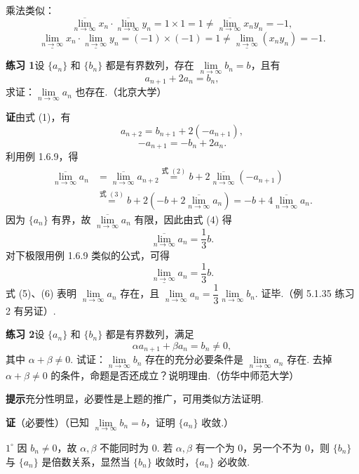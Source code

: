 \documentclass[UTF8,12pt,a4paper,fontset=fandol]{ctexart}
\begin{document}
乘法类似：
\[
  \overline{\lim_{n\to\infty}}x_n\cdot\overline{\lim_{n\to\infty}}y_n=1\times1=1
  \ne \overline{\lim_{n\to\infty}}x_ny_n=-1,
\]
\[
  \underline{\lim_{n\to\infty}}x_n\cdot\underline{\lim_{n\to\infty}}y_n=(-1)\times(-1)=1
  \ne \underline{\lim_{n\to\infty}}(x_ny_n)=-1.
\]

\noindent\textbf{练习 1}\quad 设 $\{a_n\}$ 和 $\{b_n\}$ 都是有界数列，存在 $\lim\limits_{n\to\infty}b_n=b$，且有
\[
  a_{n+1}+2a_n=b_n,
\tag{1}
\]
求证：$\lim\limits_{n\to\infty}a_n$ 也存在.（北京大学）

\noindent\textbf{证}\quad 由式 (1)，有
\[
  a_{n+2}=b_{n+1}+2(-a_{n+1}),
\tag{2}
\]
\[
  -a_{n+1}=-b_n+2a_n.
\tag{3}
\]
利用例 1.6.9，得
\[
\begin{aligned}
  \overline{\lim_{n\to\infty}}a_n
  &=\overline{\lim_{n\to\infty}}a_{n+2}
   \overset{\text{式 }(2)}{=} b+2\overline{\lim_{n\to\infty}}(-a_{n+1})\\
  &\overset{\text{式 }(3)}{=} b+2\left(-b+2\overline{\lim_{n\to\infty}}a_n\right)
   =-b+4\overline{\lim_{n\to\infty}}a_n.
\end{aligned}
\tag{4}
\]
因为 $\{a_n\}$ 有界，故 $\overline{\lim\limits_{n\to\infty}}a_n$ 有限，因此由式 (4) 得
\[
  \overline{\lim_{n\to\infty}}a_n=\frac13 b.
\tag{5}
\]
对下极限用例 1.6.9 类似的公式，可得
\[
  \underline{\lim_{n\to\infty}}a_n=\frac13 b.
\tag{6}
\]
式 (5)、(6) 表明 $\lim\limits_{n\to\infty}a_n$ 存在，且 $\lim\limits_{n\to\infty}a_n=\dfrac13\lim\limits_{n\to\infty}b_n$. 证毕.（例 5.1.35 练习 2 有另证）.

\noindent\textbf{练习 2}\quad 设 $\{a_n\}$ 和 $\{b_n\}$ 都是有界数列，满足
\[
  \alpha a_{n+1}+\beta a_n=b_n\ne0,
\tag{1}
\]
其中 $\alpha+\beta\ne0$. 试证：$\lim\limits_{n\to\infty}b_n$ 存在的充分必要条件是 $\lim\limits_{n\to\infty}a_n$ 存在. 去掉 $\alpha+\beta\ne0$ 的条件，命题是否还成立？说明理由.（仿华中师范大学）

\noindent\textbf{提示}\quad 充分性明显，必要性是上题的推广，可用类似方法证明.

\noindent\textbf{证}\quad （必要性）（已知 $\lim\limits_{n\to\infty}b_n=b$，证明 $\{a_n\}$ 收敛.）

$1^\circ$ 因 $b_n\ne0$，故 $\alpha,\beta$ 不能同时为 0. 若 $\alpha,\beta$ 有一个为 0，另一个不为 0，则 $\{b_n\}$ 与 $\{a_n\}$ 是倍数关系，显然当 $\{b_n\}$ 收敛时，$\{a_n\}$ 必收敛.
\end{document}
